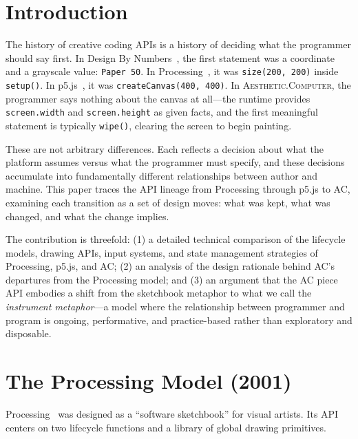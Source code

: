 \documentclass[10pt,letterpaper,twocolumn]{article}
\newcommand{\ac}{\textsc{Aesthetic.Computer}}
\begin{document}

\section{Introduction}

The history of creative coding APIs is a history of deciding what the programmer should say first. In Design By Numbers~\citep{maeda2001dbn}, the first statement was a coordinate and a grayscale value: \texttt{Paper 50}. In Processing~\citep{reas2003processing}, it was \texttt{size(200, 200)} inside \texttt{setup()}. In p5.js~\citep{mccarthy2015p5js}, it was \texttt{createCanvas(400, 400)}. In \ac{}, the programmer says nothing about the canvas at all---the runtime provides \texttt{screen.width} and \texttt{screen.height} as given facts, and the first meaningful statement is typically \texttt{wipe()}, clearing the screen to begin painting.

These are not arbitrary differences. Each reflects a decision about what the platform assumes versus what the programmer must specify, and these decisions accumulate into fundamentally different relationships between author and machine. This paper traces the API lineage from Processing through p5.js to AC, examining each transition as a set of design moves: what was kept, what was changed, and what the change implies.

The contribution is threefold: (1) a detailed technical comparison of the lifecycle models, drawing APIs, input systems, and state management strategies of Processing, p5.js, and AC; (2) an analysis of the design rationale behind AC's departures from the Processing model; and (3) an argument that the AC piece API embodies a shift from the sketchbook metaphor to what we call the \emph{instrument metaphor}---a model where the relationship between programmer and program is ongoing, performative, and practice-based rather than exploratory and disposable.


\section{The Processing Model (2001)}
\label{sec:processing}

Processing~\citep{reas2007processing} was designed as a ``software sketchbook'' for visual artists. Its API centers on two lifecycle functions and a library of global drawing primitives.
\end{document}
